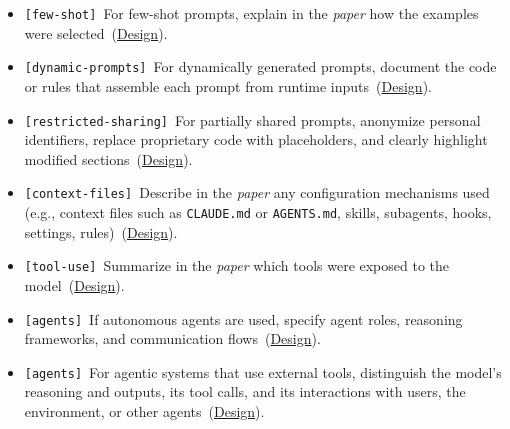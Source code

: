 \documentclass[smallextended]{svjour3}
\makeatletter
\newcommand{\must}{\textbf{must}\xspace}
\newcommand{\should}{\textbf{should}\xspace}
\newcommand{\paper}{\emph{paper}\xspace}
\newcommand{\paper}{\emph{paper}\xspace}
\newcommand{\iconM}{\usebox{\iconMbox}\xspace}
\newcommand{\iconM}{●\xspace}
\newcommand{\condition}[1]{\texttt{\small[#1]}\,}
\newcommand{\condition}[1]{@@cond:#1@@}
\newcommand{\refdesign}{\hyperref[sec:report-system-and-prompt-design]{Design}}
\newcommand{\refdesign}{\href{/guidelines/design/}{Design}}
\makeatother
\begin{document}
\begin{appendices}
\begin{itemize}[label={},leftmargin=*]
    \item \iconM \condition{few-shot} For few-shot prompts, explain in the \paper how the examples were selected~(\refdesign).
    \item \iconM \condition{dynamic-prompts} For dynamically generated prompts, document the code or rules that assemble each prompt from runtime inputs~(\refdesign).
    \item \iconM \condition{restricted-sharing} For partially shared prompts, anonymize personal identifiers, replace proprietary code with placeholders, and clearly highlight modified sections~(\refdesign).
    \item \iconM \condition{context-files} Describe in the \paper any configuration mechanisms used (e.g., context files such as \texttt{CLAUDE.md} or \texttt{AGENTS.md}, skills, subagents, hooks, settings, rules)~(\refdesign).
    \item \iconM \condition{tool-use} Summarize in the \paper which tools were exposed to the model~(\refdesign).
    \item \iconM \condition{agents} If autonomous agents are used, specify agent roles, reasoning frameworks, and communication flows~(\refdesign).
    \item \iconM \condition{agents} For agentic systems that use external tools, distinguish the model's reasoning and outputs, its tool calls, and its interactions with users, the environment, or other agents~(\refdesign).

\end{itemize}
\end{appendices}
\end{document}
